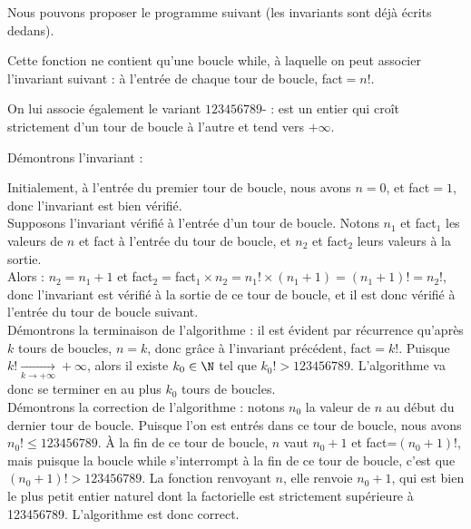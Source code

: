 Nous pouvons proposer le programme suivant (les invariants sont déjà écrits dedans).


Cette fonction ne contient qu'une boucle while, à laquelle on peut associer l'invariant suivant : à l'entrée de 
chaque tour de boucle, fact$=n!$.

On lui associe également le variant $123456789$- :  est un entier qui croît strictement d'un tour de boucle à l'autre et 
tend vers $+\infty$.

Démontrons l'invariant : 

Initialement, à l'entrée du premier tour de boucle, nous avons $n=0$, et fact$=1$, donc l'invariant est bien vérifié.\\
Supposons l'invariant vérifié à l'entrée d'un tour de boucle. Notons $n_1$ et fact$_1$ les valeurs de $n$ et fact à 
l'entrée du tour de boucle, et $n_2$ et fact$_2$ leurs valeurs à la sortie.\\
Alors : $n_2=n_1+1$ et fact$_2=$fact$_1\times n_2=n_1!\times(n_1+1)=(n_1+1)!=n_2!$, donc l'invariant est vérifié à la 
sortie de ce tour de boucle, et il est donc vérifié à l'entrée du tour de boucle suivant.\\

Démontrons la terminaison de l'algorithme : il est évident par récurrence qu'après $k$ tours de boucles, $n=k$, donc 
grâce à l'invariant précédent, fact$=k!$. Puisque $k!\xrightarrow[k\to+\infty]{}+\infty$, alors il existe $k_0\in\N$ 
tel que $k_0!>123456789$. L'algorithme va donc se terminer en au plus $k_0$ tours de boucles.\\

Démontrons la correction de l'algorithme : notons $n_0$ la valeur de $n$ au début du dernier tour de boucle. Puisque 
l'on est entrés dans ce tour de boucle, nous avons $n_0!\leq 123456789$. À la fin de ce tour de boucle, $n$ vaut 
$n_0+1$ et fact=$(n_0+1)!$, mais puisque la boucle while s'interrompt à la fin de ce tour de boucle, c'est que 
$(n_0+1)!>123456789$. La fonction renvoyant $n$, elle renvoie $n_0+1$, qui est bien le plus petit entier naturel dont 
la factorielle est strictement supérieure à 123456789. L'algorithme est donc correct.

